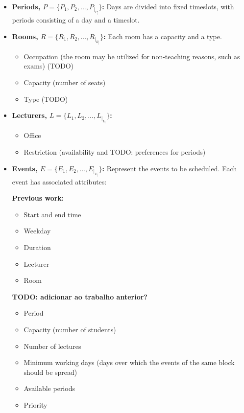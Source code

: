 \begin{itemize}
	\item \textbf{Periods, \(P = \{P_1, P_2, ..., P_|_P_|\}\):} Days are divided into fixed timeslots, with periods consisting of a day and a timeslot.


	\item \textbf{Rooms, \(R = \{R_1, R_2, ..., R_|_R_|\}\):} Each room has a capacity and a type.
		\begin{itemize}
			\item Occupation (the room may be utilized for non-teaching reasons, such as exams) (TODO)
			\item Capacity (number of seats)
			\item Type (TODO)
		\end{itemize}

	\item \textbf{Lecturers, \(L = \{L_1, L_2, ..., L_|_L_|\}\):} 
		\begin{itemize}
			\item Office
			\item Restriction (availability and TODO: preferences for periods)
		\end{itemize}

	\item \textbf{Events, \(E = \{E_1, E_2, ..., E_|_E_|\}\):} Represent the events to be scheduled. Each event has associated attributes:
		\begin{multicols}{2}
		\textbf{Previous work:}
		\begin{itemize}
			\item Start and end time
			\item Weekday
			\item Duration
			\item Lecturer
			\item Room
		\end{itemize}
		\columnbreak
		\textbf{TODO: adicionar ao trabalho anterior?}
		\begin{itemize}
			\item Period
        		\item Capacity (number of students)
        		\item Number of lectures
        		\item Minimum working days (days over which the events of the same block should be spread)
        		\item Available periods
        		\item Priority
		\end{itemize}
		\end{multicols} 


\end{itemize}
